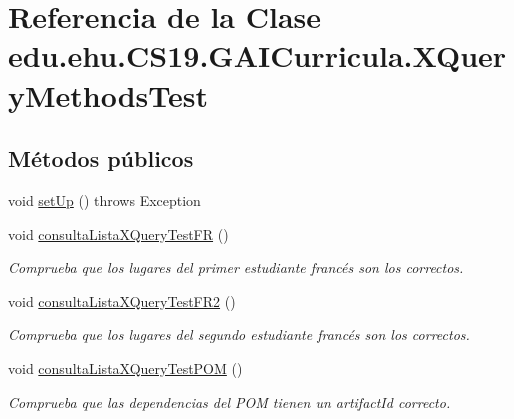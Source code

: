 \hypertarget{classedu_1_1ehu_1_1_c_s19_1_1_g_a_i_curricula_1_1_x_query_methods_test}{}\section{Referencia de la Clase edu.\+ehu.\+C\+S19.\+G\+A\+I\+Curricula.\+X\+Query\+Methods\+Test}
\label{classedu_1_1ehu_1_1_c_s19_1_1_g_a_i_curricula_1_1_x_query_methods_test}
\subsection*{Métodos públicos}
\begin{DoxyCompactItemize}
\item 
void \mbox{\hyperlink{classedu_1_1ehu_1_1_c_s19_1_1_g_a_i_curricula_1_1_x_query_methods_test_a7fea8bc0d25f1588cba324be6bcd088e}{set\+Up}} ()  throws Exception 
\item 
void \mbox{\hyperlink{classedu_1_1ehu_1_1_c_s19_1_1_g_a_i_curricula_1_1_x_query_methods_test_a9c391172ac7518b50fad0569a710d3e7}{consulta\+Lista\+X\+Query\+Test\+FR}} ()
\begin{DoxyCompactList}\small\item\em Comprueba que los lugares del primer estudiante francés son los correctos. \end{DoxyCompactList}\item 
void \mbox{\hyperlink{classedu_1_1ehu_1_1_c_s19_1_1_g_a_i_curricula_1_1_x_query_methods_test_ab30b1e554a49678887f748e9050ec173}{consulta\+Lista\+X\+Query\+Test\+F\+R2}} ()
\begin{DoxyCompactList}\small\item\em Comprueba que los lugares del segundo estudiante francés son los correctos. \end{DoxyCompactList}\item 
void \mbox{\hyperlink{classedu_1_1ehu_1_1_c_s19_1_1_g_a_i_curricula_1_1_x_query_methods_test_a424440e0527b515a698294d6859d258a}{consulta\+Lista\+X\+Query\+Test\+P\+OM}} ()
\begin{DoxyCompactList}\small\item\em Comprueba que las dependencias del P\+OM tienen un artifact\+Id correcto. \end{DoxyCompactList}\end{DoxyCompactItemize}
